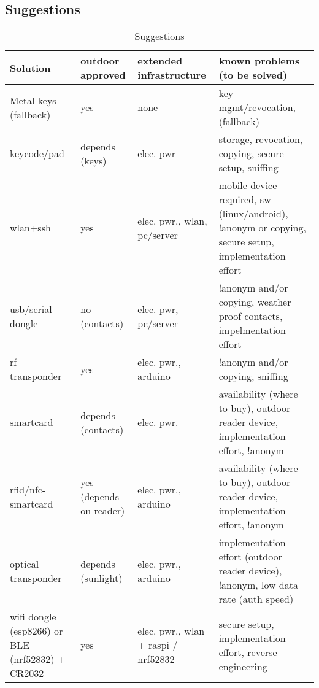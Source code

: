 \documentclass[10pt,a4paper]{scrartcl}
\begin{document}
\subsection*{Suggestions}
\begin{table}[h!]
  \centering
  \caption{Suggestions}
  \label{tab:table1}
  \begin{tabular}{p{2cm}||p{1.8cm}|p{2.5cm}|p{7cm}}
    \textbf{Solution} & \textbf{outdoor approved} & \textbf{extended infrastructure} & \textbf{known problems (to be solved)}\\
    \hline
    \hline
	Metal keys (fallback) & yes & none & key-mgmt/revocation, (fallback)\\
    \hline
    keycode/pad & depends (keys) & elec. pwr & storage, revocation, copying, secure setup, sniffing\\
    \hline
    wlan+ssh & yes& elec. pwr., wlan, pc/server & mobile device required, sw (linux/android), !anonym or copying,  secure setup, implementation effort\\
    \hline
    usb/serial dongle & no (contacts) & elec. pwr, pc/server & !anonym and/or copying, weather proof contacts, impelmentation effort\\
    \hline
    rf transponder & yes & elec. pwr., arduino & !anonym and/or copying, sniffing\\
    \hline
    smartcard & depends (contacts) & elec. pwr. & availability (where to buy), outdoor reader device, implementation effort, !anonym\\
    \hline
    rfid/nfc-smartcard & yes (depends on reader) & elec. pwr., arduino & availability (where to buy), outdoor reader device, implementation effort, !anonym\\
    \hline
    optical transponder & depends (sunlight) & elec. pwr., arduino & implementation effort (outdoor reader device), !anonym, low data rate (auth speed)\\
    \hline
    wifi dongle (esp8266) or BLE (nrf52832) + CR2032 & yes & elec. pwr., wlan + raspi / nrf52832 & secure setup, implementation effort, reverse engineering\\
    \hline
    \hline
  \end{tabular}
\end{table}
\end{document}
